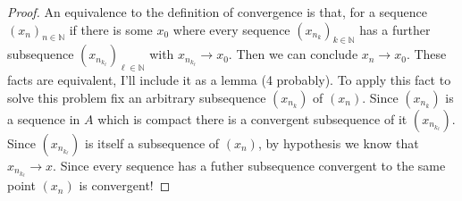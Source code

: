 \documentclass[12pt,leqno]{amsart}
\begin{document}
\begin{proof}
An equivalence to the definition of convergence is that, for a sequence $(x_n)_{n \in \mathbb{N}}$ if there is some $x_0$ where every sequence $(x_{n_k})_{k\in \mathbb{N}}$ has a further subsequence $(x_{n_{k_\ell}})_{\ell \in \mathbb{N}}$ with $x_{n_{k_\ell}} \to x_0$.  Then we can conclude $x_n \to x_0$.  These facts are equivalent, I'll include it as a lemma (4 probably).  To apply this fact to solve this problem fix an arbitrary subsequence $(x_{n_k})$ of $(x_n)$.  Since $(x_{n_k})$ is a sequence in $A$ which is compact there is a convergent subsequence of it $(x_{n_{k_\ell}})$.  Since $(x_{n_{k_\ell}})$ is itself a subsequence of $(x_n)$, by hypothesis we know that $x_{n_{k_\ell}} \to x$.  Since every sequence has a futher subsequence convergent to the same point $(x_n)$ is convergent!
\end{proof} 
\end{document}
